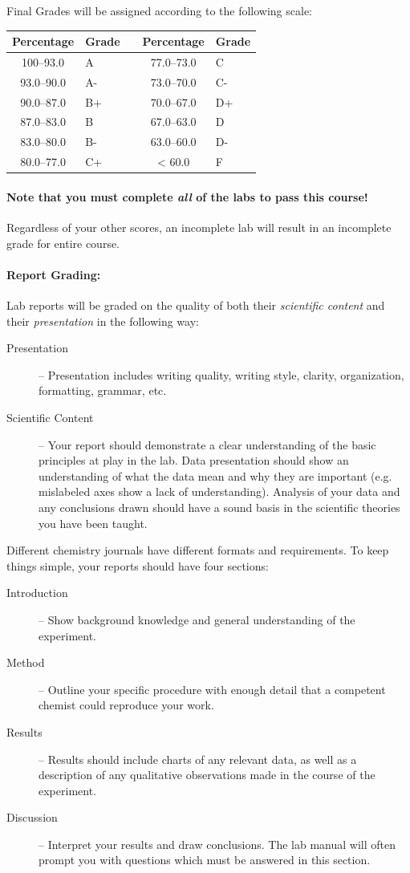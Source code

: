 \documentclass[12pt, letterpaper]{article}
\begin{document}
\noindent Final Grades will be assigned according to the following scale:

\begin{tabular}{cl|c|cl}
	Percentage & Grade &  & Percentage & Grade \\ \midrule
	100--93.0  & A     &  & 77.0--73.0 & C     \\
	93.0--90.0 & A-    &  & 73.0--70.0 & C-    \\
	90.0--87.0 & B+    &  & 70.0--67.0 & D+    \\
	87.0--83.0 & B     &  & 67.0--63.0 & D     \\
	83.0--80.0 & B-    &  & 63.0--60.0 & D-    \\
	80.0--77.0 & C+    &  & < 60.0     & F
\end{tabular}

\paragraph{Note that you must complete \emph{all} of the labs to pass this course!} Regardless of your other scores, an incomplete lab will result in an incomplete grade for entire course.

\paragraph{Report Grading:}
Lab reports will be graded on the quality of both their \emph{scientific content} and their \emph{presentation} in the following way:
\begin{description}
	\item[Presentation] -- Presentation includes writing quality, writing style, clarity, organization, formatting, grammar, etc.

	\item[Scientific Content] -- Your report should demonstrate a clear understanding of the basic principles at play in the lab. Data presentation should show an understanding of what the data mean and why they  are important (e.g. mislabeled axes show a lack of understanding). Analysis of your data and any conclusions drawn should have a sound basis in the scientific theories you have been taught.
\end{description}

\noindent Different chemistry journals have different formats and requirements. To keep things simple, your reports should have four sections:
\begin{description}
	\item[Introduction] -- Show background knowledge and general understanding of the experiment.
	\item[Method] -- Outline your specific procedure with enough detail that a competent chemist could reproduce your work.
	\item[Results] -- Results should include charts of any relevant data, as well as a description of any qualitative observations made in the course of the experiment.
	\item[Discussion] -- Interpret your results and draw conclusions. The lab manual will often prompt you with questions which must be answered in this section.
\end{description}
\end{document}
